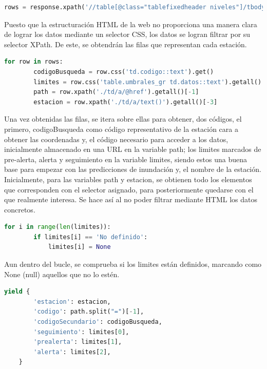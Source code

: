 \begin{lstlisting}[language=Python, caption={Selector en \textit{parse()} de CHCantábrico Code Spider}]
	rows = response.xpath('//table[@class="tablefixedheader niveles"]/tbody/tr')
\end{lstlisting}

Puesto que la estructuración HTML de la web no proporciona una manera clara de lograr los datos mediante un selector CSS, los datos se logran filtrar por su selector XPath. De este, se obtendrán las filas que representan cada estación.

\begin{lstlisting}[language=Python, caption={Trabajar sobre los datos de CHCantábrico Code Spider}]
	for row in rows:
		codigoBusqueda = row.css('td.codigo::text').get()
		limites = row.css('table.umbrales_gr td.datos::text').getall()
		path = row.xpath('./td/a/@href').getall()[-1]
		estacion = row.xpath('./td/a/text()').getall()[-3]
\end{lstlisting}

Una vez obtenidas las filas, se itera sobre ellas para obtener, dos códigos, el primero, codigoBusqueda como código representativo de la estación cara a obtener las coordenadas y, el código necesario para acceder a los datos, inicialmente almacenado en una URL en la variable path; los limites marcados de pre-alerta, alerta y seguimiento en la variable limites, siendo estos una buena base para empezar con las predicciones de inundación y, el nombre de la estación.\newline
\newline
Inicialmente, para las variables path y estacion, se obtienen todo los elementos que corresponden con el selector asignado, para posteriormente quedarse con el que realmente interesa. Se hace así al no poder filtrar mediante HTML los datos concretos.

\begin{lstlisting}[language=Python, caption={Combrobar limites de CHCantábrico Code Spider}]
	for i in range(len(limites)):
		if limites[i] == 'No definido':
			limites[i] = None
\end{lstlisting}

Aun dentro del bucle, se comprueba si los limites están definidos, marcando como None (null) aquellos que no lo estén.

\begin{lstlisting}[language=Python, caption={Guardado de datos de CHCantábrico Code Spider}]
	yield {
		'estacion': estacion,
		'codigo': path.split("=")[-1],
		'codigoSecundario': codigoBusqueda,
		'seguimiento': limites[0],
		'prealerta': limites[1],
		'alerta': limites[2],
	}
\end{lstlisting}

